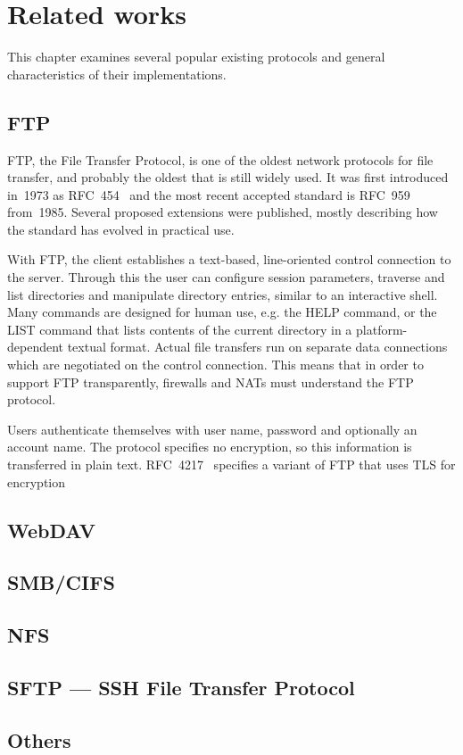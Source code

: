 \chapter{Related works}

This chapter examines several popular existing protocols and general characteristics
of their implementations.

\section{FTP}

FTP, the File Transfer Protocol, is one of the oldest network protocols for file transfer, and probably the
oldest that is still widely used. It was first introduced in~1973 as RFC~454~\cite{rfc454} and the most recent
accepted standard is RFC~959~\cite{rfc959} from~1985. Several proposed extensions were published, mostly
describing how the standard has evolved in practical use.

With FTP, the client establishes a text-based, line-oriented control connection to the server. Through this
the user can configure session parameters, traverse and list directories and manipulate directory entries,
similar to an interactive shell. Many commands are designed for human use, e.g. the HELP command, or the LIST
command that lists contents of the current directory in a platform-dependent textual format. Actual file
transfers run on separate data connections which are negotiated on the control connection. This means that in
order to support FTP transparently, firewalls and NATs must understand the FTP protocol.

Users authenticate themselves with user name, password and optionally an account name. The protocol specifies
no encryption, so this information is transferred in plain text. RFC~4217~\cite{rfc4217} specifies a variant
of FTP that uses TLS for encryption

\section{WebDAV}

\section{SMB/CIFS}

\section{NFS}

\section{SFTP --- SSH File Transfer Protocol}

\section{Others}
